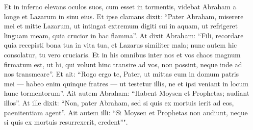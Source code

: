 \begin{biblechapter}
\verse Et in inferno elevans oculos suos, cum esset in tormentis, videbat Abraham a longe et Lazarum in sinu eius. 
\verse Et ipse clamans dixit: “Pater Abraham, miserere mei et mitte Lazarum, ut intingat extremum digiti sui in aquam, ut refrigeret linguam meam, quia crucior in hac flamma”. 
\verse At dixit Abraham: “Fili, recordare quia recepisti bona tua in vita tua, et Lazarus similiter mala; nunc autem hic consolatur, tu vero cruciaris. 
\verse Et in his omnibus inter nos et vos chaos magnum firmatum est, ut hi, qui volunt hinc transire ad vos, non possint, neque inde ad nos transmeare”. 
\verse Et ait: “Rogo ergo te, Pater, ut mittas eum in domum patris mei 
\verse — habeo enim quinque fratres — ut testetur illis, ne et ipsi veniant in locum hunc tormentorum”. 
\verse Ait autem Abraham: “Habent Moysen et Prophetas; audiant illos”. 
\verse At ille dixit: “Non, pater Abraham, sed si quis ex mortuis ierit ad eos, paenitentiam agent”. 
\verse Ait autem illi: “Si Moysen et Prophetas non audiunt, neque si quis ex mortuis resurrexerit, credent”". 
\end{biblechapter}

